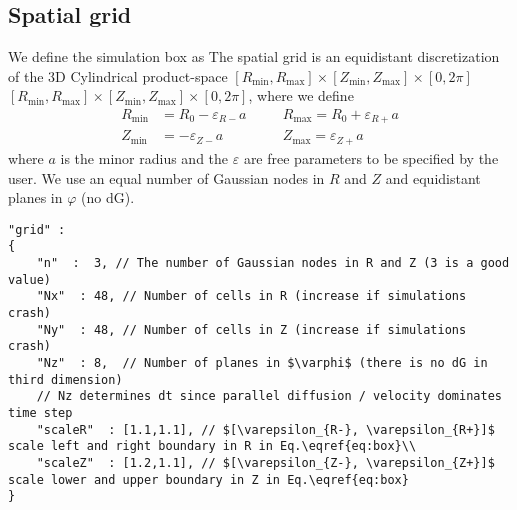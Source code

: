 \subsection{Spatial grid} \label{sec:spatial}
We define the simulation box as
The spatial grid is an equidistant discretization of the 3D Cylindrical
product-space $[R_{\min},R_{\max}] \times [Z_{\min},Z_{\max}] \times [0,2\pi]$
$[ R_{\min}, R_{\max}]\times [Z_{\min}, Z_{\max}] \times [0,2\pi]$,
where we define
\begin{align} \label{eq:box}
    R_{\min}&=R_0-\varepsilon_{R-}a\quad
    &&R_{\max}=R_0+\varepsilon_{R+}a\nonumber\\
    Z_{\min}&=-\varepsilon_{Z-}a\quad
    &&Z_{\max}=\varepsilon_{Z+}a
\end{align}
where $a$ is the minor radius and
the $\varepsilon$ are free parameters to be specified by the user.
We use an equal number of Gaussian nodes in $R$ and $Z$ and equidistant
planes in $\varphi$ (no dG).
\begin{verbatim}
"grid" :
{
    "n"  :  3, // The number of Gaussian nodes in R and Z (3 is a good value)
    "Nx"  : 48, // Number of cells in R (increase if simulations crash)
    "Ny"  : 48, // Number of cells in Z (increase if simulations crash)
    "Nz"  : 8,  // Number of planes in $\varphi$ (there is no dG in third dimension)
    // Nz determines dt since parallel diffusion / velocity dominates time step
    "scaleR"  : [1.1,1.1], // $[\varepsilon_{R-}, \varepsilon_{R+}]$ scale left and right boundary in R in Eq.\eqref{eq:box}\\
    "scaleZ"  : [1.2,1.1], // $[\varepsilon_{Z-}, \varepsilon_{Z+}]$ scale lower and upper boundary in Z in Eq.\eqref{eq:box}
}
\end{verbatim}
